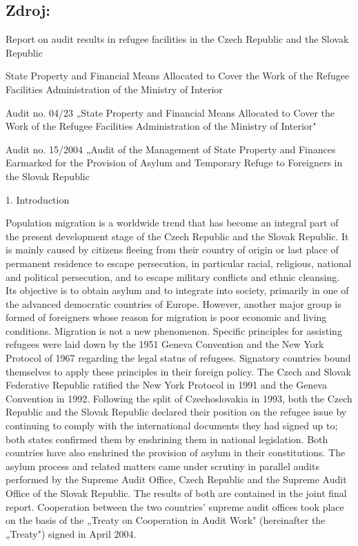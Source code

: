 \documentclass[10pt]{article}
\begin{document}
\subsection*{Zdroj:}



Report on audit results in refugee facilities in the Czech Republic and the Slovak Republic



State Property and Financial Means Allocated to Cover the Work of the Refugee Facilities Administration of the Ministry of Interior



Audit no. 04/23 „State Property and Financial Means Allocated to Cover the Work of the Refugee Facilities Administration of the Ministry of Interior"



Audit no. 15/2004 „Audit of the Management of State Property and Finances Earmarked for the Provision of Asylum and Temporary Refuge to Foreigners in the Slovak Republic



1. Introduction

Population migration is a worldwide trend that has become an integral part of the present development stage of the Czech Republic and the Slovak Republic.
It is mainly caused by citizens fleeing from their country of origin or last place of permanent residence to escape persecution, in particular racial, religious, national and political persecution, and to escape military conflicts and ethnic cleansing.
Its objective is to obtain asylum and to integrate into society, primarily in one of the advanced democratic countries of Europe.
However, another major group is formed of foreigners whose reason for migration is poor economic and living conditions.
Migration is not a new phenomenon.
Specific principles for assisting refugees were laid down by the 1951 Geneva Convention and the New York Protocol of 1967 regarding the legal status of refugees. Signatory countries bound themselves to apply these principles in their foreign policy.
The Czech and Slovak Federative Republic ratified the New York Protocol in 1991 and the Geneva Convention in 1992.
Following the split of Czechoslovakia in 1993, both the Czech Republic and the Slovak Republic declared their position on the refugee issue by continuing to comply with the international documents they had signed up to; both states confirmed them by enshrining them in national legislation.
Both countries have also enshrined the provision of asylum in their constitutions.
The asylum process and related matters came under scrutiny in parallel audits performed by the Supreme Audit Office, Czech Republic and the Supreme Audit Office of the Slovak Republic. The results of both are contained in the joint final report.
Cooperation between the two countries' supreme audit offices took place on the basis of the „Treaty on Cooperation in Audit Work" (hereinafter the „Treaty") signed in April 2004.
\end{document}
